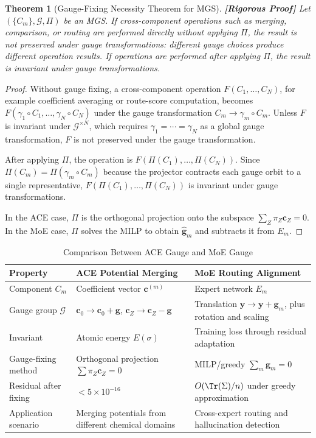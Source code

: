 \documentclass[12pt,a4paper]{article}
\newtheorem{theorem}{Theorem}[section]
\theoremstyle{remark}
\newcommand{\G}{\mathcal{G}}
\newcommand{\rigorFull}{\textnormal{\textbf{[Rigorous Proof]}}}
\begin{document}
\begin{theorem}[Gauge-Fixing Necessity Theorem for MGS]\label{thm:mgs_necessity}\rigorFull
Let $(\{C_m\}, \G, \Pi)$ be an MGS. If cross-component operations such as merging, comparison, or routing are performed directly without applying $\Pi$, the result is not preserved under gauge transformations: different gauge choices produce different operation results. If operations are performed after applying $\Pi$, the result is invariant under gauge transformations.
\end{theorem}

\begin{proof}
Without gauge fixing, a cross-component operation $F(C_1, \ldots, C_N)$, for example coefficient averaging or route-score computation, becomes $F(\gamma_1 \circ C_1, \ldots, \gamma_N \circ C_N)$ under the gauge transformation $C_m \to \gamma_m \circ C_m$. Unless $F$ is invariant under $\G^{\times N}$, which requires $\gamma_1 = \cdots = \gamma_N$ as a global gauge transformation, $F$ is not preserved under the gauge transformation.

After applying $\Pi$, the operation is $F(\Pi(C_1), \ldots, \Pi(C_N))$. Since $\Pi(C_m) = \Pi(\gamma_m \circ C_m)$ because the projector contracts each gauge orbit to a single representative, $F(\Pi(C_1), \ldots, \Pi(C_N))$ is invariant under gauge transformations.

In the ACE case, $\Pi$ is the orthogonal projection onto the subspace $\sum_Z \pi_Z \mathbf{c}_Z = 0$. In the MoE case, $\Pi$ solves the MILP to obtain $\hat{\mathbf{g}}_m$ and subtracts it from $E_m$.
\end{proof}

\begin{table}[H]
\centering
\caption{Comparison Between ACE Gauge and MoE Gauge}
\begin{tabular}{p{3.5cm} p{4.5cm} p{4.5cm}}
\toprule
\textbf{Property} & \textbf{ACE Potential Merging} & \textbf{MoE Routing Alignment} \\
\midrule
Component $C_m$ & Coefficient vector $\mathbf{c}^{(m)}$ & Expert network $E_m$ \\
Gauge group $\G$ & $\mathbf{c}_0 \to \mathbf{c}_0 + \mathbf{g}$, $\mathbf{c}_Z \to \mathbf{c}_Z - \mathbf{g}$ & Translation $\mathbf{y} \to \mathbf{y} + \mathbf{g}_m$, plus rotation and scaling \\
Invariant & Atomic energy $E(\sigma)$ & Training loss through residual adaptation \\
Gauge-fixing method & Orthogonal projection $\sum \pi_Z \mathbf{c}_Z = 0$ & MILP/greedy $\sum_m \mathbf{g}_m = 0$ \\
Residual after fixing & $< 5 \times 10^{-16}$ & $O(\Tr(\Sigma)/n)$ under greedy approximation \\
Application scenario & Merging potentials from different chemical domains & Cross-expert routing and hallucination detection \\
\bottomrule
\end{tabular}
\end{table}
\end{document}
